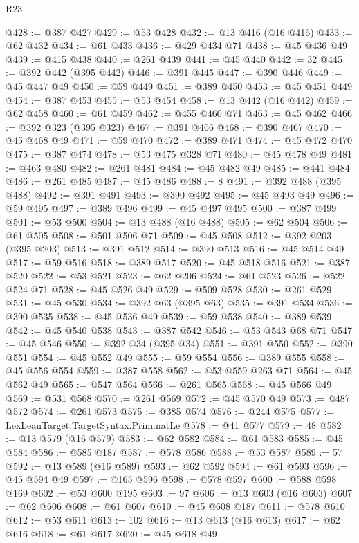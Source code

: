 \begin{lexlean}{R23}
\begin{coremodule}
@428 := @387 @427
@429 := @53 @428
@432 := @13 @416 (@16 @416)
@433 := @62 @432
@434 := @61 @433
@436 := @429 @434 @71
@438 := @45 @436 @49
@439 := @415 @438
@440 := @261 @439
@441 := @45 @440
@442 := 32
@445 := @392 @442 (@395 @442)
@446 := @391 @445
@447 := @390 @446
@449 := @45 @447 @49
@450 := @59 @449
@451 := @389 @450
@453 := @45 @451 @449
@454 := @387 @453
@455 := @53 @454
@458 := @13 @442 (@16 @442)
@459 := @62 @458
@460 := @61 @459
@462 := @455 @460 @71
@463 := @45 @462
@466 := @392 @323 (@395 @323)
@467 := @391 @466
@468 := @390 @467
@470 := @45 @468 @49
@471 := @59 @470
@472 := @389 @471
@474 := @45 @472 @470
@475 := @387 @474
@478 := @53 @475 @328 @71
@480 := @45 @478 @49
@481 := @463 @480
@482 := @261 @481
@484 := @45 @482 @49
@485 := @441 @484
@486 := @261 @485
@487 := @45 @486
@488 := 8
@491 := @392 @488 (@395 @488)
@492 := @391 @491
@493 := @390 @492
@495 := @45 @493 @49
@496 := @59 @495
@497 := @389 @496
@499 := @45 @497 @495
@500 := @387 @499
@501 := @53 @500
@504 := @13 @488 (@16 @488)
@505 := @62 @504
@506 := @61 @505
@508 := @501 @506 @71
@509 := @45 @508
@512 := @392 @203 (@395 @203)
@513 := @391 @512
@514 := @390 @513
@516 := @45 @514 @49
@517 := @59 @516
@518 := @389 @517
@520 := @45 @518 @516
@521 := @387 @520
@522 := @53 @521
@523 := @62 @206
@524 := @61 @523
@526 := @522 @524 @71
@528 := @45 @526 @49
@529 := @509 @528
@530 := @261 @529
@531 := @45 @530
@534 := @392 @63 (@395 @63)
@535 := @391 @534
@536 := @390 @535
@538 := @45 @536 @49
@539 := @59 @538
@540 := @389 @539
@542 := @45 @540 @538
@543 := @387 @542
@546 := @53 @543 @68 @71
@547 := @45 @546
@550 := @392 @34 (@395 @34)
@551 := @391 @550
@552 := @390 @551
@554 := @45 @552 @49
@555 := @59 @554
@556 := @389 @555
@558 := @45 @556 @554
@559 := @387 @558
@562 := @53 @559 @263 @71
@564 := @45 @562 @49
@565 := @547 @564
@566 := @261 @565
@568 := @45 @566 @49
@569 := @531 @568
@570 := @261 @569
@572 := @45 @570 @49
@573 := @487 @572
@574 := @261 @573
@575 := @385 @574
@576 := @244 @575
@577 := LexLeanTarget.TargetSyntax.Prim.natLe
@578 := @41 @577
@579 := 48
@582 := @13 @579 (@16 @579)
@583 := @62 @582
@584 := @61 @583
@585 := @45 @584
@586 := @585 @187
@587 := @578 @586
@588 := @53 @587
@589 := 57
@592 := @13 @589 (@16 @589)
@593 := @62 @592
@594 := @61 @593
@596 := @45 @594 @49
@597 := @165 @596
@598 := @578 @597
@600 := @588 @598 @169
@602 := @53 @600 @195
@603 := 97
@606 := @13 @603 (@16 @603)
@607 := @62 @606
@608 := @61 @607
@610 := @45 @608 @187
@611 := @578 @610
@612 := @53 @611
@613 := 102
@616 := @13 @613 (@16 @613)
@617 := @62 @616
@618 := @61 @617
@620 := @45 @618 @49

\end{coremodule}
\end{lexlean}
